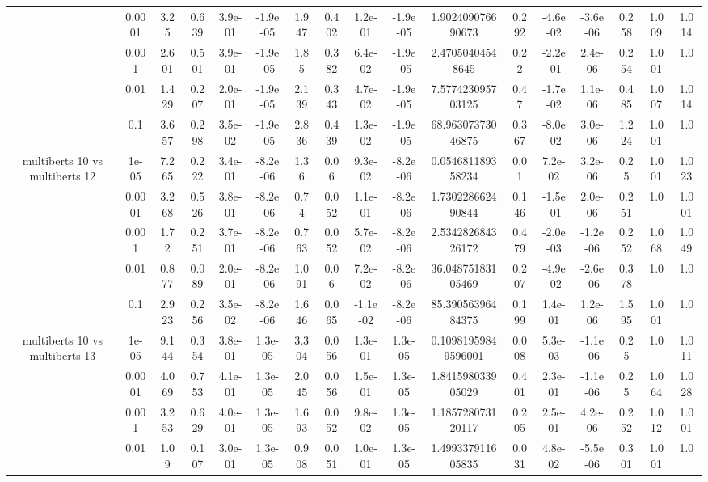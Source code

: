 \begin{tabular}{|c|c|c|c|c|c|c|c|c|c|c|c|c|c|c|c|c|}
 & 0.0001 & 3.25 & 0.639 & 3.9e-01 & -1.9e-05 & 1.947 & 0.402 & 1.2e-01 & -1.9e-05 & 1.902409076690673 & 0.292 & -4.6e-02 & -3.6e-06 & 0.258 & 1.009 & 1.014 \\
 & 0.001 & 2.601 & 0.501 & 3.9e-01 & -1.9e-05 & 1.85 & 0.382 & 6.4e-02 & -1.9e-05 & 2.47050404548645 & 0.22 & -2.2e-01 & 2.4e-06 & 0.254 & 1.001 & 1.0 \\
 & 0.01 & 1.429 & 0.207 & 2.0e-01 & -1.9e-05 & 2.139 & 0.343 & 4.7e-02 & -1.9e-05 & 7.577423095703125 & 0.47 & -1.7e-02 & 1.1e-06 & 0.485 & 1.007 & 1.014 \\
 & 0.1 & 3.657 & 0.298 & 3.5e-02 & -1.9e-05 & 2.836 & 0.439 & 1.3e-02 & -1.9e-05 & 68.96307373046875 & 0.367 & -8.0e-02 & 3.0e-06 & 1.224 & 1.001 & 1.0 \\
\hline
\multirow{5}{*}{multiberts 10 vs multiberts 12} & 1e-05 & 7.265 & 0.222 & 3.4e-01 & -8.2e-06 & 1.36 & 0.06 & 9.3e-02 & -8.2e-06 & 0.054681189358234 & 0.01 & 7.2e-02 & 3.2e-06 & 0.25 & 1.001 & 1.023 \\
 & 0.0001 & 3.268 & 0.526 & 3.8e-01 & -8.2e-06 & 0.74 & 0.052 & 1.1e-01 & -8.2e-06 & 1.730228662490844 & 0.146 & -1.5e-01 & 2.0e-06 & 0.251 & 1.0 & 1.001 \\
 & 0.001 & 1.72 & 0.251 & 3.7e-01 & -8.2e-06 & 0.763 & 0.052 & 5.7e-02 & -8.2e-06 & 2.534282684326172 & 0.479 & -2.0e-03 & -1.2e-06 & 0.252 & 1.068 & 1.049 \\
 & 0.01 & 0.877 & 0.089 & 2.0e-01 & -8.2e-06 & 1.091 & 0.06 & 7.2e-02 & -8.2e-06 & 36.04875183105469 & 0.207 & -4.9e-02 & -2.6e-06 & 0.378 & 1.0 & 1.0 \\
 & 0.1 & 2.923 & 0.256 & 3.5e-02 & -8.2e-06 & 1.646 & 0.065 & -1.1e-02 & -8.2e-06 & 85.39056396484375 & 0.199 & 1.4e-01 & 1.2e-06 & 1.595 & 1.001 & 1.0 \\
\hline
\multirow{5}{*}{multiberts 10 vs multiberts 13} & 1e-05 & 9.144 & 0.354 & 3.8e-01 & 1.3e-05 & 3.304 & 0.056 & 1.3e-01 & 1.3e-05 & 0.10981959849596001 & 0.008 & 5.3e-03 & -1.1e-06 & 0.25 & 1.0 & 1.011 \\
 & 0.0001 & 4.069 & 0.753 & 4.1e-01 & 1.3e-05 & 2.045 & 0.056 & 1.5e-01 & 1.3e-05 & 1.841598033905029 & 0.401 & 2.3e-01 & -1.1e-06 & 0.25 & 1.064 & 1.028 \\
 & 0.001 & 3.253 & 0.629 & 4.0e-01 & 1.3e-05 & 1.693 & 0.052 & 9.8e-02 & 1.3e-05 & 1.185728073120117 & 0.205 & 2.5e-01 & 4.2e-06 & 0.252 & 1.012 & 1.001 \\
 & 0.01 & 1.09 & 0.107 & 3.0e-01 & 1.3e-05 & 0.908 & 0.051 & 1.0e-01 & 1.3e-05 & 1.499337911605835 & 0.031 & 4.8e-02 & -5.5e-06 & 0.301 & 1.001 & 1.0 \\

\end{tabular}
